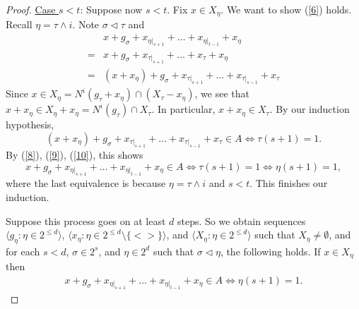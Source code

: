 \documentclass[11pt]{article}
\theoremstyle{definition}
\begin{document}
\begin{proof}
\vspace{5mm}
\noindent \underline{Case $s<t$}: Suppose now $s<t$.  Fix $x\in X_{\eta}$.  We want to show (\ref{6}) holds.  Recall $\eta=\tau \wedge i$. Note $\sigma\triangleleft \tau$ and 
\begin{align}
&x+g_{\sigma}+ x_{\eta|_{s+1}}+\ldots+x_{\eta|_{t-1}}+x_{\eta}\label{8} \\ 
=&x+g_{\sigma}+x_{\tau|_{s+1}}+\ldots +x_{\tau}+x_{\eta} \label{9}\\ 
=&(x+x_{\eta})+g_{\sigma}+ x_{\tau|_{s+1}}+\ldots+x_{\tau|_{s-1}}+x_{\tau}\label{10}
\end{align}
Since $x\in X_{\eta} = N^i(g_{\tau}+x_{\eta})\cap (X_{\tau}-x_{\eta}) $, we see that $x+x_{\eta}\in X_{\eta}+x_{\eta}= N^i(g_{\tau})\cap X_{\tau}$.  In particular, $x+x_{\eta}\in X_{\tau}$.  By our induction hypothesis, 
$$
(x+x_{\eta})+g_{\sigma}+ x_{\tau|_{s+1}}+\ldots+x_{\tau|_{s-1}}+x_{\tau} \in A \Leftrightarrow \tau(s+1)=1.
$$
By (\ref{8}), (\ref{9}), (\ref{10}), this shows
$$
x+g_{\sigma}+ x_{\eta|_{s+1}}+\ldots+x_{\eta|_{t-1}}+x_{\eta} \in A \Leftrightarrow \tau(s+1)=1 \Leftrightarrow \eta(s+1)=1,
$$
where the last equivalence is because $\eta=\tau \wedge i$ and $s<t$.  This finishes our induction.


Suppose this process goes on at least $d$ steps.  So we obtain sequences $\langle g_{\eta}: \eta\in 2^{\leq d}\rangle$, $\langle x_{\eta}: \eta\in 2^{\leq d}\setminus \{<>\}\rangle$, and $\langle X_{\eta}: \eta\in 2^{\leq d}\rangle$ such that $X_{\eta}\neq \emptyset$, and for each $s<d$, $\sigma \in 2^{s}$, and $\eta\in 2^{d}$ such that $\sigma \triangleleft \eta$, the following holds.  If $x\in X_{\eta}$ then 
\begin{align}\label{5}
x+g_{\sigma}+ x_{\eta|_{s+1}}+\ldots+x_{\eta|_{t-1}}+x_{\eta} \in A \Leftrightarrow \eta(s+1)=1.
\end{align}



\end{proof}
\end{document}
